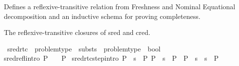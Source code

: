 %
\begin{isabellebody}%
%
%
\isadelimtheory
%
\endisadelimtheory
%
\isatagtheory
%
\endisatagtheory
{\isafoldtheory}%
%
\isadelimtheory
%
\endisadelimtheory
%
\isadelimdocument
%
\endisadelimdocument
%
\isatagdocument
%
\isamarkuptrue%
%
\endisatagdocument
{\isafolddocument}%
%
\isadelimdocument
%
\endisadelimdocument
%
\begin{isamarkuptext}%
Defines a reflexive-transitive relation from Freshness and Nominal Equational decomposition
and an inductive schema for proving completeness.%
\end{isamarkuptext}\isamarkuptrue%
%
\begin{isamarkuptext}%
The reflexive-transitive closures of sred and cred.%
\end{isamarkuptext}\isamarkuptrue%
\isamarkupfalse%
\ sred{\isacharunderscore}{\kern0pt}rtc\ {\isacharcolon}{\kern0pt}{\isacharcolon}{\kern0pt}\ {\isachardoublequoteopen}problem{\isacharunderscore}{\kern0pt}type\ {\isasymRightarrow}\ substs\ {\isasymRightarrow}\ problem{\isacharunderscore}{\kern0pt}type\ {\isasymRightarrow}\ bool{\isachardoublequoteclose}\ {\isacharparenleft}{\kern0pt}{\isachardoublequoteopen}{\isacharunderscore}{\kern0pt}\ {\isasymturnstile}\ {\isacharunderscore}{\kern0pt}\ {\isasymleadsto}\isactrlsup {\isacharasterisk}{\kern0pt}\ {\isacharunderscore}{\kern0pt}{\isachardoublequoteclose}\ {\isacharbrackleft}{\kern0pt}{}{}{\isacharcomma}{\kern0pt}{}{}{\isacharcomma}{\kern0pt}{}{}{\isacharbrackright}{\kern0pt}\ {}{}{\isacharparenright}{\kern0pt}\isanewline
\ \ \isanewline
sred{\isacharunderscore}{\kern0pt}refl{\isacharbrackleft}{\kern0pt}intro{\isacharbang}{\kern0pt}{\isacharbrackright}{\kern0pt}{\isacharcolon}{\kern0pt}\ {\isachardoublequoteopen}P{}\ {\isasymturnstile}\ {\isacharbrackleft}{\kern0pt}{\isacharbrackright}{\kern0pt}\ {\isasymleadsto}\isactrlsup {\isacharasterisk}{\kern0pt}\ P{}{\isachardoublequoteclose}\ {\isacharbar}{\kern0pt}\isanewline
sred{\isacharunderscore}{\kern0pt}rtc{\isacharunderscore}{\kern0pt}step{\isacharbrackleft}{\kern0pt}intro{\isacharbang}{\kern0pt}{\isacharbrackright}{\kern0pt}{\isacharcolon}{\kern0pt}\ {\isachardoublequoteopen}{\isasymlbrakk}P{}\ {\isasymturnstile}\ s{}\ {\isasymleadsto}\ P{}{\isacharsemicolon}{\kern0pt}\ P{}\ {\isasymturnstile}\ s{}\ {\isasymleadsto}\isactrlsup {\isacharasterisk}{\kern0pt}\ P{}{\isasymrbrakk}\ {\isasymLongrightarrow}\ P{}\ {\isasymturnstile}\ {\isacharparenleft}{\kern0pt}s{}\ {\isasymbullet}\ s{}{\isacharparenright}{\kern0pt}\ {\isasymleadsto}\isactrlsup {\isacharasterisk}{\kern0pt}\ P{}{\isachardoublequoteclose}\isanewline

\end{isabellebody}
